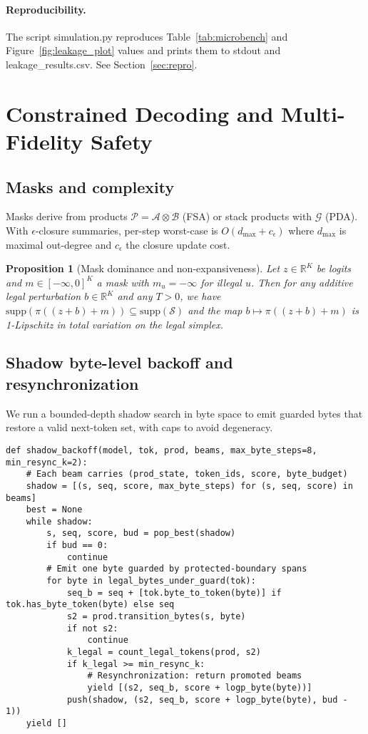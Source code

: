 \documentclass{article}
\newtheorem{proposition}{Proposition}
\begin{document}
\paragraph{Reproducibility.} The script simulation.py reproduces Table~\ref{tab:microbench} and Figure~\ref{fig:leakage_plot} values and prints them to stdout and leakage\_results.csv. See Section~\ref{sec:repro}.

\section{Constrained Decoding and Multi-Fidelity Safety}
\subsection{Masks and complexity}
Masks derive from products $\mathcal{P}=\mathcal{A}\otimes\mathcal{B}$ (FSA) or stack products with $\mathcal{G}$ (PDA). With $\epsilon$-closure summaries, per-step worst-case is $O(d_{\max}+c_\epsilon)$ where $d_{\max}$ is maximal out-degree and $c_\epsilon$ the closure update cost.

\begin{proposition}[Mask dominance and non-expansiveness]
Let $z\in\mathbb{R}^K$ be logits and $m\in[-\infty,0]^K$ a mask with $m_u=-\infty$ for illegal $u$. Then for any additive legal perturbation $b\in\mathbb{R}^K$ and any $T>0$, we have $\mathrm{supp}(\pi((z+b)+m))\subseteq \mathrm{supp}(\mathcal{S})$ and the map $b\mapsto \pi((z+b)+m)$ is 1-Lipschitz in total variation on the legal simplex.
\end{proposition}

\subsection{Shadow byte-level backoff and resynchronization}
We run a bounded-depth shadow search in byte space to emit guarded bytes that restore a valid next-token set, with caps to avoid degeneracy.

\begin{lstlisting}[style=py, caption={Shadow byte-level backoff with resynchronization and caps.}]
def shadow_backoff(model, tok, prod, beams, max_byte_steps=8, min_resync_k=2):
    # Each beam carries (prod_state, token_ids, score, byte_budget)
    shadow = [(s, seq, score, max_byte_steps) for (s, seq, score) in beams]
    best = None
    while shadow:
        s, seq, score, bud = pop_best(shadow)
        if bud == 0:
            continue
        # Emit one byte guarded by protected-boundary spans
        for byte in legal_bytes_under_guard(tok):
            seq_b = seq + [tok.byte_to_token(byte)] if tok.has_byte_token(byte) else seq
            s2 = prod.transition_bytes(s, byte)
            if not s2:
                continue
            k_legal = count_legal_tokens(prod, s2)
            if k_legal >= min_resync_k:
                # Resynchronization: return promoted beams
                yield [(s2, seq_b, score + logp_byte(byte))]
            push(shadow, (s2, seq_b, score + logp_byte(byte), bud - 1))
    yield []
\end{lstlisting}
\end{document}
